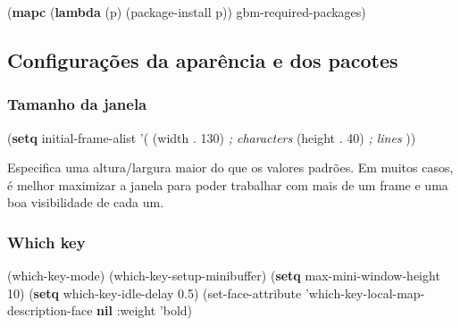 \documentclass[]{article}
\newenvironment{Shaded}{}{}
\newcommand{\KeywordTok}[1]{\textcolor[rgb]{0.00,0.44,0.13}{\textbf{{#1}}}}
\newcommand{\DecValTok}[1]{\textcolor[rgb]{0.25,0.63,0.44}{{#1}}}
\newcommand{\FloatTok}[1]{\textcolor[rgb]{0.25,0.63,0.44}{{#1}}}
\newcommand{\CommentTok}[1]{\textcolor[rgb]{0.38,0.63,0.69}{\textit{{#1}}}}
\newcommand{\NormalTok}[1]{{#1}}
\begin{document}
\begin{Shaded}
\begin{Highlighting}[]
\NormalTok{(}\KeywordTok{mapc} \NormalTok{(}\KeywordTok{lambda} \NormalTok{(p)}
        \NormalTok{(package-install p))}
      \NormalTok{gbm-required-packages)}
\end{Highlighting}
\end{Shaded}

\subsection{Configurações da aparência e dos
pacotes}\label{configurauxe7uxf5es-da-aparuxeancia-e-dos-pacotes}

\subsubsection{Tamanho da janela}\label{tamanho-da-janela}

\begin{Shaded}
\begin{Highlighting}[]
\NormalTok{(}\KeywordTok{setq} \NormalTok{initial-frame-alist}
      \NormalTok{'(}
        \NormalTok{(width . }\DecValTok{130}\NormalTok{) }\CommentTok{; characters}
        \NormalTok{(height . }\DecValTok{40}\NormalTok{) }\CommentTok{; lines}
        \NormalTok{))}
\end{Highlighting}
\end{Shaded}

Especifica uma altura/largura maior do que os valores padrões. Em muitos
casos, é melhor maximizar a janela para poder trabalhar com mais de um
frame e uma boa visibilidade de cada um.

\subsubsection{Which key}\label{which-key}

\begin{Shaded}
\begin{Highlighting}[]
\NormalTok{(which-key-mode)}
\NormalTok{(which-key-setup-minibuffer)}
\NormalTok{(}\KeywordTok{setq} \NormalTok{max-mini-window-height }\DecValTok{10}\NormalTok{)}
\NormalTok{(}\KeywordTok{setq} \NormalTok{which-key-idle-delay }\FloatTok{0.5}\NormalTok{)}
\NormalTok{(set-face-attribute 'which-key-local-map-description-face }\KeywordTok{nil} \NormalTok{:weight 'bold)}
\end{Highlighting}
\end{Shaded}
\end{document}
